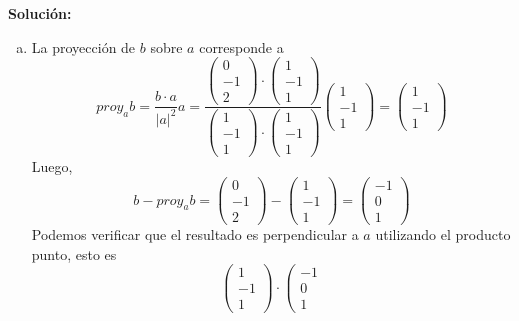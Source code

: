 \documentclass[12pt]{article}
\newenvironment{solucion}
{\begin{mdframed}[backgroundcolor=black!10]
		{\bf Solución:}\\
	}
	{
	\end{mdframed}
}
\newenvironment{preguntas}
{\begin{enumerate}\itemsep12pt
	}
	{
	\end{enumerate}
}
\begin{document}
\begin{preguntas}
\begin{solucion}
\begin{enumerate}[a)]
\item La proyección de $b$ sobre $a$ corresponde a
$$proy_{a}b = \dfrac{b \cdot a}{|a|^2}a =   \dfrac{\left(\begin{array}{r}
	0\\-1\\2
	\end{array}\right) \cdot\left(\begin{array}{r}
		1\\-1\\1
	\end{array}\right)}{\left(\begin{array}{r}
		1\\-1\\1
	\end{array}\right) \cdot \left(\begin{array}{r}
		1\\-1\\1
	\end{array}\right)}\left(\begin{array}{r}
		1\\-1\\1
	\end{array}\right) = \left(\begin{array}{r}
1\\-1\\1
\end{array}\right)$$
Luego, 
$$b-proy_a b = \left(\begin{array}{r}
0\\-1\\2
\end{array}\right) - \left(\begin{array}{r}
1\\-1\\1
\end{array}\right) = \left(\begin{array}{r}
-1\\0\\1
\end{array}\right)$$
Podemos verificar que el resultado es perpendicular a $a$ utilizando el producto punto, esto es
$$\left(\begin{array}{r}
1\\-1\\1
\end{array}\right) \cdot \left(\begin{array}{r}
-1\\0\\1

\end{array}$$
\end{enumerate}
\end{solucion}
\end{preguntas}
\end{document}
